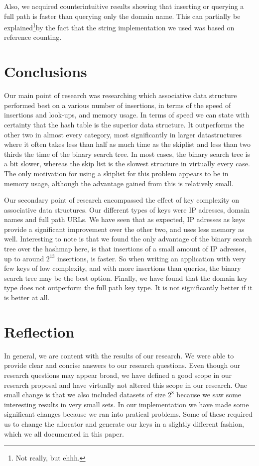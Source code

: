 \documentclass[12pt,a4paper]{article}
\begin{document}
    Also, we acquired counterintuitive results showing that inserting or querying a full path is
    faster than querying only the domain name.  This can partially be explained\footnote{Not really,
    but ehhh.}by the fact that the string implementation we used was based on reference counting.

    \section{Conclusions}
    Our main point of research was researching which associative data structure performed best on a
    various number of insertions, in terms of the speed of insertions and look-ups, and memory
    usage.  In terms of speed we can state with certainty that the hash table is the superior data
    structure.  It outperforms the other two in almost every category, most significantly in larger
    datastructures where it often takes less than half as much time as the skiplist and less than
    two thirds the time of the binary search tree.  In most cases, the binary search tree is a bit
    slower, whereas the skip list is the slowest structure in virtually every case. The only
    motivation for using a skiplist for this problem appears to be in memory usage, although the
    advantage gained from this is relatively small.

    Our secondary point of research encompassed the effect of key complexity on associative data
    structures.  Our different types of keys were IP adresses, domain names and full path URLs. We
    have seen that as expected, IP adresses as keys provide a significant improvement over the other
    two, and uses less memory as well. Interesting to note is that we found the only advantage of
    the binary search tree over the hashmap here, is that insertions of a small amount of IP
    adresses, up to around $2^13$ insertions, is faster. So when writing an application with very
    few keys of low complexity, and with more insertions than queries, the binary search tree may be
    the best option. Finally, we have found that the domain key type does not outperform the full
    path key type. It is not significantly better if it is better at all.

    \section{Reflection}
    In general, we are content with the results of our research. We were able to provide clear and
    concise answers to our research questions. Even though our research questions may appear broad,
    we have defined a good scope in our research proposal and have virtually not altered this scope
    in our research. One small change is that we also included datasets of size $2^8$ because we saw
    some interesting results in very small sets. In our implementation we have made some significant
    changes because we ran into pratical problems. Some of these required us to change the allocator
    and generate our keys in a slightly different fashion, which we all documented in this paper.
\end{document}
